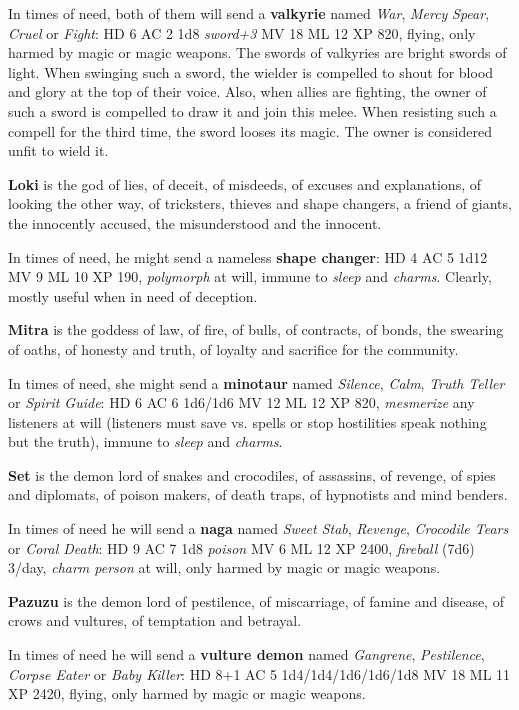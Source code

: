 \documentclass[11pt]{bxart}
\begin{document}
In times of need, both of them will send a \textbf{valkyrie} named \textit{War}, \textit{Mercy} \textit{Spear}, \textit{Cruel} or \textit{Fight}: HD 6 AC 2 1d8 \textit{sword+3} MV 18 ML 12 XP 820, flying, only harmed by magic or magic weapons. The swords of valkyries are bright swords of light. When swinging such a sword, the wielder is compelled to shout for blood and glory at the top of their voice. Also, when allies are fighting, the owner of such a sword is compelled to draw it and join this melee. When resisting such a compell for the third time, the sword looses its magic. The owner is considered unfit to wield it.

\textbf{Loki} is the god of lies, of deceit, of misdeeds, of excuses and explanations, of looking the other way, of tricksters, thieves and shape changers, a friend of giants, the innocently accused, the misunderstood and the innocent.

In times of need, he might send a nameless \textbf{shape changer}: HD 4 AC 5 1d12 MV 9 ML 10 XP 190, \textit{polymorph} at will, immune to \textit{sleep} and \textit{charms}. Clearly, mostly useful when in need of deception.

\textbf{Mitra} is the goddess of law, of fire, of bulls, of contracts, of bonds, the swearing of oaths, of honesty and truth, of loyalty and sacrifice for the community. 

In times of need, she might send a \textbf{minotaur} named \textit{Silence}, \textit{Calm}, \textit{Truth Teller} or \textit{Spirit Guide}: HD 6 AC 6 1d6/1d6 MV 12 ML 12 XP 820, \textit{mesmerize} any listeners at will (listeners must save vs. spells or stop hostilities speak nothing but the truth), immune to \textit{sleep} and \textit{charms}.

\textbf{Set} is the demon lord of snakes and crocodiles, of assassins, of revenge, of spies and diplomats, of poison makers, of death traps, of hypnotists and mind benders.

In times of need he will send a \textbf{naga} named \textit{Sweet Stab}, \textit{Revenge}, \textit{Crocodile Tears} or \textit{Coral Death}: HD 9 AC 7 1d8 \textit{poison} MV 6 ML 12 XP 2400, \textit{fireball} (7d6) 3/day, \textit{charm person} at will, only harmed by magic or magic weapons.

\textbf{Pazuzu} is the demon lord of pestilence, of miscarriage, of famine and disease, of crows and vultures, of temptation and betrayal.

In times of need he will send a \textbf{vulture demon} named \textit{Gangrene}, \textit{Pestilence}, \textit{Corpse Eater} or \textit{Baby Killer}: HD 8+1 AC 5 1d4/1d4/1d6/1d6/1d8 MV 18 ML 11 XP 2420, flying, only harmed by magic or magic weapons.
\end{document}
